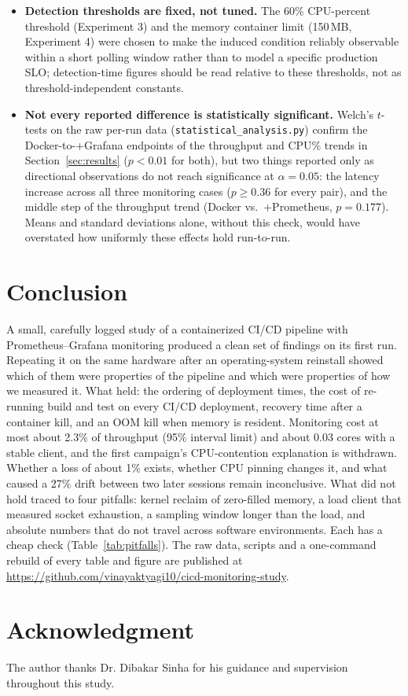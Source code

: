 \documentclass[conference]{IEEEtran}
\begin{document}
\begin{itemize}
Experiment~6. The 60\% target loads 16 logical CPUs on 8 physical
cores, so it is not saturation, and SMT sharing adds noise at that level. Its
background-CPU precondition was relaxed from 0.5 to 1.5 cores because the
interactive desktop could not be closed; unattributed CPU is recorded per run.
\item \textbf{Detection thresholds are fixed, not tuned.} The 60\%
CPU-percent threshold (Experiment 3) and the memory container limit (150\,MB,
Experiment 4) were chosen to make the induced condition reliably observable
within a short polling window rather than to model a specific production SLO;
detection-time figures should be read relative to these thresholds, not as
threshold-independent constants.
\item \textbf{Not every reported difference is statistically significant.}
Welch's $t$-tests on the raw per-run data (\texttt{statistical\_analysis.py})
confirm the Docker-to-+Grafana endpoints of the throughput and CPU\% trends
in Section~\ref{sec:results} ($p{<}0.01$ for both), but two things reported
only as directional observations do not reach significance at
$\alpha{=}0.05$: the latency increase across all three monitoring cases
($p \geq 0.36$ for every pair), and the middle step of the throughput trend
(Docker vs.\ +Prometheus, $p{=}0.177$). Means and standard deviations alone,
without this check, would have overstated how uniformly these effects hold
run-to-run.
\end{itemize}

\section{Conclusion}

A small, carefully logged study of a containerized CI/CD pipeline with
Prometheus--Grafana monitoring produced a clean set of findings on its first run.
Repeating it on the same hardware after an operating-system reinstall showed which of
them were properties of the pipeline and which were properties of how we measured it.
What held: the ordering of deployment times, the cost of re-running build and test on
every CI/CD deployment, recovery time after a container kill, and an OOM kill when
memory is resident. Monitoring cost at most about 2.3\% of throughput (95\% interval
limit) and about 0.03 cores with a stable client, and the first campaign's CPU-contention explanation is
withdrawn. Whether a loss of about 1\% exists, whether CPU pinning changes it, and what
caused a 27\% drift between two later sessions remain inconclusive. What did not hold
traced to four pitfalls: kernel reclaim
of zero-filled memory, a load client that measured socket exhaustion, a sampling
window longer than the load, and absolute numbers that do not travel across software
environments. Each has a cheap check (Table~\ref{tab:pitfalls}). The raw data,
scripts and a one-command rebuild of every table and figure are published at
\url{https://github.com/vinayaktyagi10/cicd-monitoring-study}.

\section*{Acknowledgment}
The author thanks Dr. Dibakar Sinha for his guidance and supervision
throughout this study.



\end{document}
